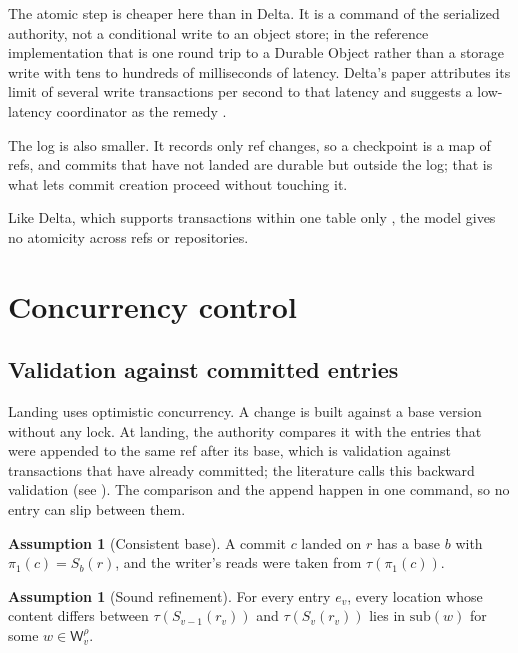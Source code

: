 \documentclass[11pt,letterpaper]{article}
\theoremstyle{definition}
\newtheorem{assumption}[theorem]{Assumption}
\theoremstyle{remark}
\newcommand{\W}{\mathsf{W}}
\newcommand{\Snap}[1]{S_{#1}}
\newcommand{\tree}{\tau}
\newcommand{\fp}{\pi_1}
\begin{document}
The atomic step is cheaper here than in Delta. It is a command of the serialized authority, not a conditional write to an object store; in the reference implementation that is one round trip to a Durable Object rather than a storage write with tens to hundreds of milliseconds of latency. Delta's paper attributes its limit of several write transactions per second to that latency and suggests a low-latency coordinator as the remedy \cite{armbrust2020delta}.

The log is also smaller. It records only ref changes, so a checkpoint is a map of refs, and commits that have not landed are durable but outside the log; that is what lets commit creation proceed without touching it.

Like Delta, which supports transactions within one table only \cite{armbrust2020delta}, the model gives no atomicity across refs or repositories.

\section{Concurrency control}
\label{sec:tlsc:occ}

\subsection{Validation against committed entries}

Landing uses optimistic concurrency. A change is built against a base version without any lock. At landing, the authority compares it with the entries that were appended to the same ref after its base, which is validation against transactions that have already committed; the literature calls this backward validation (see \cite{harder1984occ}). The comparison and the append happen in one command, so no entry can slip between them.

\begin{assumption}[Consistent base]
\label{ass:tlsc:base}
A commit $c$ landed on $r$ has a base $b$ with $\fp(c)=\Snap{b}(r)$, and the writer's reads were taken from $\tree(\fp(c))$.
\end{assumption}

\begin{assumption}[Sound refinement]
\label{ass:tlsc:refine}
For every entry $e_v$, every location whose content differs between $\tree(\Snap{v-1}(r_v))$ and $\tree(\Snap{v}(r_v))$ lies in $\mathrm{sub}(w)$ for some $w\in\W^{\rho}_v$.
\end{assumption}
\end{document}

